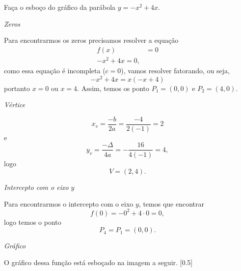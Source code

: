 \begin{example}
  Faça o esboço do gráfico da parábola
  \(
    y=-x^2+4x
  \).

  \solution
  \emph{Zeros}

  Para encontrarmos os zeros precisamos resolver a equação
  \begin{align*}
    f(x) & =0 \\
    -x^2 + 4x = 0,
  \end{align*}
  como essa equação é incompleta ($c=0$), vamos resolver fatorando,
  ou seja,
  \[
    -x^2 + 4x = x(-x+4)
  \]
  portanto $x = 0$ ou $x = 4$.
  Assim, temos os ponto $P_1=(0, 0)$ e $P_2=(4, 0)$.

  \emph{Vértice}

  \[
    x_v
    = \frac{-b}{2a}
    = \frac{-4}{2(-1)}
    = 2
  \]
  e
  \[
    y_v
    =  \frac{-\Delta}{4a}
    = -\frac{16}{4(-1)}
    = 4,
  \]
  logo
  \[
    V=\left(2, 4\right).
  \]

  \emph{Intercepto com o eixo $y$}

  Para encontrarmos o intercepto com o eixo $y$, temos que encontrar
  \[
    f(0) = -0^2 + 4 \cdot 0 = 0,
  \]
  logo temos o ponto
  \[
    P_4 = P_1 = (0, 0).
  \]

  \emph{Gráfico}

  O gráfico dessa função está esboçado na imagem a seguir.
  [0.5]
\end{example}

